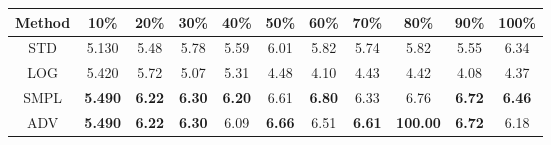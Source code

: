 \documentclass{standalone}
\begin{document}
\begin{tabular}{c|cccccccccc}
      \toprule
      Method & 10\% & 20\% & 30\% & 40\% & 50\% & 60\% & 70\% & 80\% & 90\% & 100\% \\
      \midrule
STD & 5.130 & 5.48 & 5.78 & 5.59 & 6.01 & 5.82 & 5.74 & 5.82 & 5.55 & 6.34\\
LOG & 5.420 & 5.72 & 5.07 & 5.31 & 4.48 & 4.10 & 4.43 & 4.42 & 4.08 & 4.37\\
SMPL & \textbf{5.490} & \textbf{6.22} & \textbf{6.30} & \textbf{6.20} & 6.61 & \textbf{6.80} & 6.33 & 6.76 & \textbf{6.72} & \textbf{6.46}\\
ADV & \textbf{5.490} & \textbf{6.22} & \textbf{6.30} & 6.09 & \textbf{6.66} & 6.51 & \textbf{6.61} & \textbf{100.00} & \textbf{6.72} & 6.18\\
  \bottomrule
\end{tabular}
\end{document}
